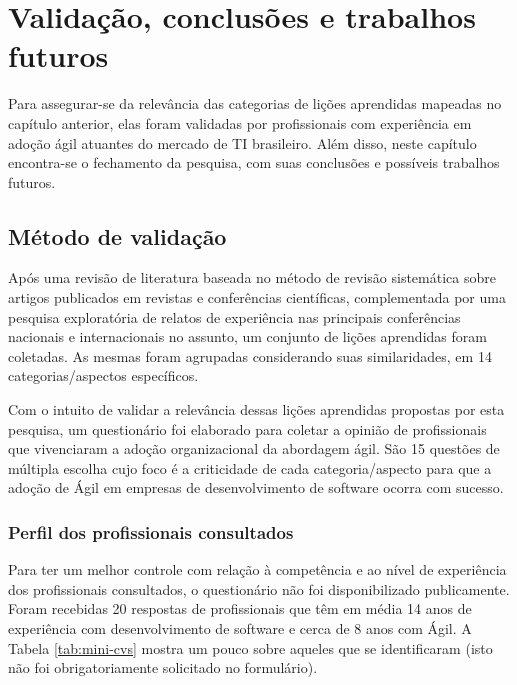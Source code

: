 \chapter{Validação, conclusões e trabalhos futuros}

Para assegurar-se da relevância das categorias de lições aprendidas mapeadas no capítulo anterior, elas foram validadas por profissionais com experiência em adoção ágil atuantes do mercado de TI brasileiro. Além disso, neste capítulo encontra-se o fechamento da pesquisa, com suas conclusões e possíveis trabalhos futuros.

\section{Método de validação}

Após uma revisão de literatura baseada no método de revisão sistemática sobre artigos publicados em revistas e conferências científicas, complementada por  uma pesquisa exploratória de relatos de experiência nas principais conferências nacionais e internacionais no assunto, um conjunto de lições aprendidas foram coletadas. As mesmas foram agrupadas considerando suas similaridades, em 14 categorias/aspectos específicos.

Com o intuito de validar a relevância dessas lições aprendidas propostas por esta pesquisa, um questionário foi elaborado para coletar a opinião de profissionais que vivenciaram a adoção organizacional da abordagem ágil. São 15 questões de múltipla escolha cujo foco é a criticidade de cada categoria/aspecto para que a adoção de Ágil em empresas de desenvolvimento de software ocorra com sucesso.

\subsection{Perfil dos profissionais consultados}

Para ter um melhor controle com relação à competência e ao nível de experiência dos profissionais consultados, o questionário não foi disponibilizado publicamente. Foram recebidas 20 respostas de profissionais que têm em média 14 anos de experiência com desenvolvimento de software e cerca de 8 anos com Ágil. A Tabela \ref{tab:mini-cvs} mostra um pouco sobre aqueles que se identificaram (isto não foi obrigatoriamente solicitado no formulário).

